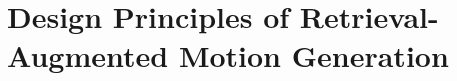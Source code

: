 \documentclass[10pt,journal,compsoc]{IEEEtran}
\begin{document}







\section{Design Principles of Retrieval-Augmented Motion Generation}
\label{sec:preliminary}
            
\end{document}
